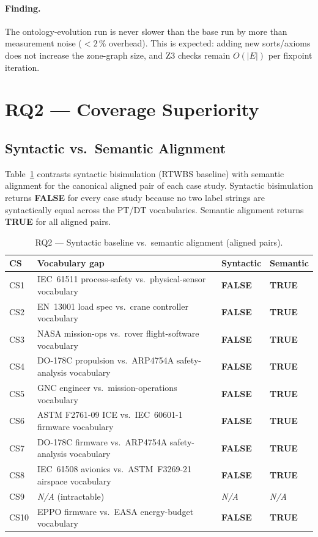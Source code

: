 \documentclass[10pt,a4paper]{article}
\newcommand{\OK}{\textcolor{okgreen}{\textbf{TRUE}}}
\newcommand{\FAIL}{\textcolor{warnred}{\textbf{FALSE}}}
\newcommand{\NA}{\textcolor{notegray}{\textit{N/A}}}
\begin{document}
\paragraph{Finding.}
The ontology-evolution run is never slower than the base run by more than
measurement noise ($< 2\,\%$ overhead). This is expected: adding new
sorts/axioms does not increase the zone-graph size, and Z3 checks remain
$O(|E|)$ per fixpoint iteration.

\section{RQ2 — Coverage Superiority}

\subsection{Syntactic vs.\ Semantic Alignment}

Table~\ref{tab:rq2_main} contrasts syntactic bisimulation (RTWBS baseline)
with semantic alignment for the canonical aligned pair of each case study.
Syntactic bisimulation returns \FAIL{} for every case study because no two
label strings are syntactically equal across the PT/DT vocabularies.
Semantic alignment returns \OK{} for all aligned pairs.

\begin{table}[htbp]
\centering
\caption{RQ2 — Syntactic baseline vs.\ semantic alignment (aligned pairs).}
\label{tab:rq2_main}
\small
\begin{tabular}{@{}llll@{}}
\toprule
\textbf{CS} & \textbf{Vocabulary gap} & \textbf{Syntactic} & \textbf{Semantic} \\
\midrule
CS1  & IEC~61511 process-safety vs.\ physical-sensor vocabulary      & \FAIL & \OK \\
CS2  & EN~13001 load spec vs.\ crane controller vocabulary           & \FAIL & \OK \\
CS3  & NASA mission-ops vs.\ rover flight-software vocabulary        & \FAIL & \OK \\
CS4  & DO-178C propulsion vs.\ ARP4754A safety-analysis vocabulary   & \FAIL & \OK \\
CS5  & GNC engineer vs.\ mission-operations vocabulary               & \FAIL & \OK \\
CS6  & ASTM F2761-09 ICE vs.\ IEC~60601-1 firmware vocabulary        & \FAIL & \OK \\
CS7  & DO-178C firmware vs.\ ARP4754A safety-analysis vocabulary     & \FAIL & \OK \\
CS8  & IEC~61508 avionics vs.\ ASTM~F3269-21 airspace vocabulary     & \FAIL & \OK \\
CS9  & \NA{} (intractable)                                           & \NA   & \NA \\
CS10 & EPPO firmware vs.\ EASA energy-budget vocabulary              & \FAIL & \OK \\
\bottomrule
\end{tabular}
\end{table}
\end{document}
